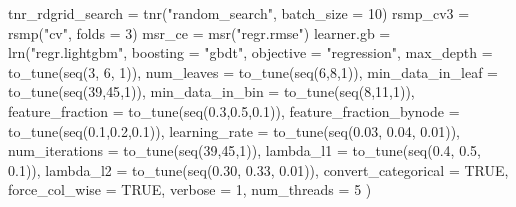 \documentclass[11pt,a4paper]{article}
\newenvironment{Shaded}{\begin{snugshade}}{\end{snugshade}}
\newcommand{\AttributeTok}[1]{\textcolor[rgb]{0.77,0.63,0.00}{#1}}
\newcommand{\ConstantTok}[1]{\textcolor[rgb]{0.00,0.00,0.00}{#1}}
\newcommand{\DecValTok}[1]{\textcolor[rgb]{0.00,0.00,0.81}{#1}}
\newcommand{\FloatTok}[1]{\textcolor[rgb]{0.00,0.00,0.81}{#1}}
\newcommand{\FunctionTok}[1]{\textcolor[rgb]{0.00,0.00,0.00}{#1}}
\newcommand{\NormalTok}[1]{#1}
\newcommand{\OtherTok}[1]{\textcolor[rgb]{0.56,0.35,0.01}{#1}}
\newcommand{\StringTok}[1]{\textcolor[rgb]{0.31,0.60,0.02}{#1}}
\begin{document}
\begin{Shaded}
\begin{Highlighting}[]
\NormalTok{tnr\_rdgrid\_search }\OtherTok{=} \FunctionTok{tnr}\NormalTok{(}\StringTok{"random\_search"}\NormalTok{, }\AttributeTok{batch\_size =} \DecValTok{10}\NormalTok{)}
\NormalTok{rsmp\_cv3 }\OtherTok{=} \FunctionTok{rsmp}\NormalTok{(}\StringTok{"cv"}\NormalTok{, }\AttributeTok{folds =} \DecValTok{3}\NormalTok{)}
\NormalTok{msr\_ce }\OtherTok{=} \FunctionTok{msr}\NormalTok{(}\StringTok{"regr.rmse"}\NormalTok{)}
\NormalTok{learner.gb }\OtherTok{=} \FunctionTok{lrn}\NormalTok{(}\StringTok{"regr.lightgbm"}\NormalTok{,}
                 \AttributeTok{boosting =} \StringTok{"gbdt"}\NormalTok{,}
                 \AttributeTok{objective =} \StringTok{"regression"}\NormalTok{,}
                 \AttributeTok{max\_depth =} \FunctionTok{to\_tune}\NormalTok{(}\FunctionTok{seq}\NormalTok{(}\DecValTok{3}\NormalTok{, }\DecValTok{6}\NormalTok{, }\DecValTok{1}\NormalTok{)),}
                 \AttributeTok{num\_leaves =} \FunctionTok{to\_tune}\NormalTok{(}\FunctionTok{seq}\NormalTok{(}\DecValTok{6}\NormalTok{,}\DecValTok{8}\NormalTok{,}\DecValTok{1}\NormalTok{)),}
                 \AttributeTok{min\_data\_in\_leaf =} \FunctionTok{to\_tune}\NormalTok{(}\FunctionTok{seq}\NormalTok{(}\DecValTok{39}\NormalTok{,}\DecValTok{45}\NormalTok{,}\DecValTok{1}\NormalTok{)),}
                 \AttributeTok{min\_data\_in\_bin =} \FunctionTok{to\_tune}\NormalTok{(}\FunctionTok{seq}\NormalTok{(}\DecValTok{8}\NormalTok{,}\DecValTok{11}\NormalTok{,}\DecValTok{1}\NormalTok{)),}
                 \AttributeTok{feature\_fraction =} \FunctionTok{to\_tune}\NormalTok{(}\FunctionTok{seq}\NormalTok{(}\FloatTok{0.3}\NormalTok{,}\FloatTok{0.5}\NormalTok{,}\FloatTok{0.1}\NormalTok{)),}
                 \AttributeTok{feature\_fraction\_bynode =} \FunctionTok{to\_tune}\NormalTok{(}\FunctionTok{seq}\NormalTok{(}\FloatTok{0.1}\NormalTok{,}\FloatTok{0.2}\NormalTok{,}\FloatTok{0.1}\NormalTok{)),}
                 \AttributeTok{learning\_rate =} \FunctionTok{to\_tune}\NormalTok{(}\FunctionTok{seq}\NormalTok{(}\FloatTok{0.03}\NormalTok{, }\FloatTok{0.04}\NormalTok{, }\FloatTok{0.01}\NormalTok{)),}
                 \AttributeTok{num\_iterations  =} \FunctionTok{to\_tune}\NormalTok{(}\FunctionTok{seq}\NormalTok{(}\DecValTok{39}\NormalTok{,}\DecValTok{45}\NormalTok{,}\DecValTok{1}\NormalTok{)),}
                 \AttributeTok{lambda\_l1 =} \FunctionTok{to\_tune}\NormalTok{(}\FunctionTok{seq}\NormalTok{(}\FloatTok{0.4}\NormalTok{, }\FloatTok{0.5}\NormalTok{, }\FloatTok{0.1}\NormalTok{)),}
                 \AttributeTok{lambda\_l2 =} \FunctionTok{to\_tune}\NormalTok{(}\FunctionTok{seq}\NormalTok{(}\FloatTok{0.30}\NormalTok{, }\FloatTok{0.33}\NormalTok{, }\FloatTok{0.01}\NormalTok{)),}
                 \AttributeTok{convert\_categorical =} \ConstantTok{TRUE}\NormalTok{,}
                 \AttributeTok{force\_col\_wise =} \ConstantTok{TRUE}\NormalTok{,}
                 \AttributeTok{verbose =} \DecValTok{1}\NormalTok{,}
                 \AttributeTok{num\_threads =} \DecValTok{5}
\NormalTok{)}


\end{Highlighting}
\end{Shaded}
\end{document}
